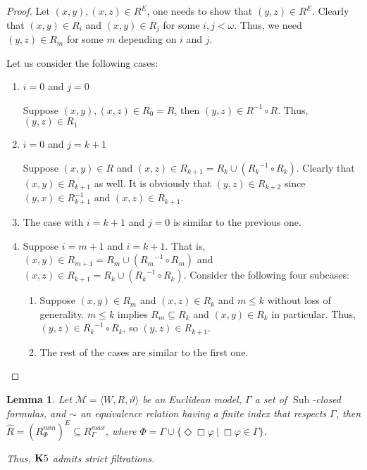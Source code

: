 \documentclass[a4paper]{article}
\theoremstyle{defin}
\theoremstyle{theorem}
\theoremstyle{prop}
\theoremstyle{lemma}
\newtheorem{lemma}{Lemma}
\theoremstyle{ex}
\theoremstyle{col}
\begin{document}
\begin{proof}
  Let $(x, y), (x, z) \in R^{E}$, one needs to show that $(y, z) \in R^{E}$.
  Clearly that $(x, y) \in R_i$ and $(x, y) \in R_j$ for some $i, j < \omega$. Thus, we need $(y, z) \in R_m$ for some $m$ depending on $i$ and $j$.

  Let us consider the following cases:
  \begin{enumerate}
    \item $i = 0$ and $j = 0$

    Suppose $(x, y), (x, z) \in R_0 = R$, then $(y, z) \in R^{-1} \circ R$. Thus, $(y, z) \in R_1$
    \item $i = 0$ and $j = k + 1$

    Suppose $(x, y) \in R$ and $(x, z) \in R_{k + 1} = R_{k} \cup ({R_k}^{-1} \circ R_k)$.
    Clearly that $(x, y) \in R_{k + 1}$ as well. It is obviously that $(y, z) \in R_{k + 2}$ since
    $(y, x) \in R_{k + 1}^{-1}$ and $(x, z) \in R_{k + 1}$.

    \item The case with $i = k + 1$ and $j = 0$ is similar to the previous one.

    \item Suppose $i = m + 1$ and $i = k + 1$. That is, $(x, y) \in R_{m + 1} = R_m \cup ({R_m}^{-1} \circ R_m)$ and $(x, z) \in R_{k + 1} = R_k \cup ({R_k}^{-1} \circ R_k)$.
    Consider the following four subcases:
    \begin{enumerate}
      \item Suppose $(x, y) \in R_m$ and $(x, z) \in R_k$ and $m \leq k$ without loss of generality.
      $m \leq k$ implies $R_m \subseteq R_k$ and $(x, y) \in R_k$ in particular. Thus, $(y, z) \in {R_k}^{-1} \circ R_k$, so $(y, z) \in R_{k + 1}$.
      \item The rest of the cases are similar to the first one.
    \end{enumerate}
    \end{enumerate}
\end{proof}

\begin{lemma}
  Let $\mathcal{M} = \langle W, R, \vartheta \rangle$ be an Euclidean model, $\Gamma$ a set of $\operatorname{Sub}$-closed formulas, and $\sim$ an equivalence relation having a finite index that respects $\Gamma$, then $\widehat{R} = (R^{min}_{\Phi})^{E} \subseteq R^{max}_{\Gamma}$, where $\Phi = \Gamma \cup \{ \Diamond \Box \varphi \: | \: \Box \varphi \in \Gamma \}$.

  Thus, ${\bf K}5$ admits strict filtrations.
\end{lemma}
\end{document}
